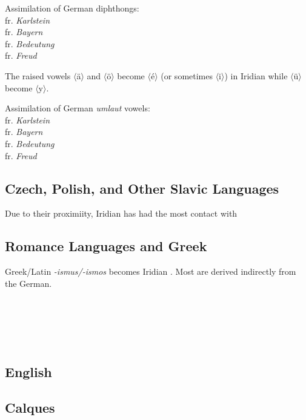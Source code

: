 \ex
Assimilation of German diphthongs:\\
 fr. \emph{Karlstein}\\
 fr. \emph{Bayern}\\
 fr. \emph{Bedeutung}\\
 fr. \emph{Freud}
\xe

The raised vowels $\langle$\"a$\rangle$ and $\langle$\"o$\rangle$ become  $\langle$\'e$\rangle$ (or sometimes  $\langle$i$\rangle$) in Iridian while $\langle$\"u$\rangle$ become  $\langle$y$\rangle$.

\ex
Assimilation of German \emph{umlaut} vowels:\\
 fr. \emph{Karlstein}\\
 fr. \emph{Bayern}\\
 fr. \emph{Bedeutung}\\
 fr. \emph{Freud}
\xe


\subsection{Czech, Polish, and Other Slavic Languages}
Due to their proximiity, Iridian has had the most contact with

\subsection{Romance Languages and Greek}

Greek/Latin \emph{-ismus/-ismos} becomes Iridian . Most are derived indirectly from the German.

\ex
{}\\
\\
\\
\\
\xe

\subsection{English}


\subsection{Calques}\label{sec:calques}
